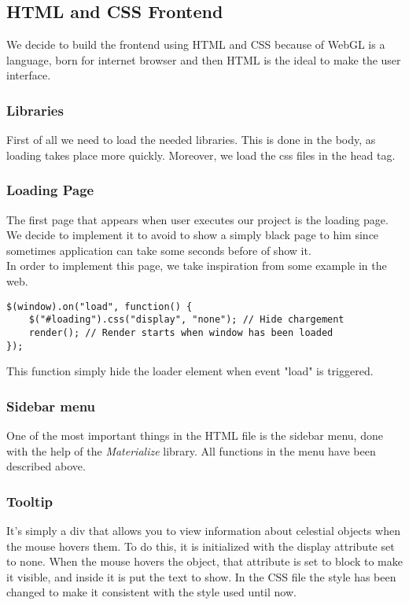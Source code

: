 \documentclass{article}
\begin{document}
\subsection{HTML and CSS Frontend}
We decide to build the frontend using HTML and CSS because of WebGL is a language, born for internet browser and then HTML is the ideal to make the user interface.
\subsubsection{Libraries}
First of all we need to load the needed libraries. This is done in the body, as loading takes place more quickly. Moreover, we load the css files in the head tag.
\subsubsection{Loading Page}
The first page that appears when user executes our project is the loading page. We decide to implement it to avoid to show a simply black page to him since sometimes application can take some seconds before of show it.\\
In order to implement this page, we take inspiration from some example in the web\cite{loadingpage:web}.
\begin{lstlisting}
$(window).on("load", function() {
	$("#loading").css("display", "none"); // Hide chargement
	render(); // Render starts when window has been loaded
});
\end{lstlisting}
This function simply hide the loader element when event "load" is triggered.
\subsubsection{Sidebar menu}
One of the most important things in the HTML file is the sidebar menu, done with the help of the \textit{Materialize}\cite{materialize} library. All functions in the menu have been described above.

\subsubsection{Tooltip}
It's simply a div that allows you to view information about celestial objects when the mouse hovers them. To do this, it is initialized with the display attribute set to none. When the mouse hovers the object, that attribute is set to block to make it visible, and inside it is put the text to show. In the CSS file the style has been changed to make it consistent with the style used until now.
\end{document}
